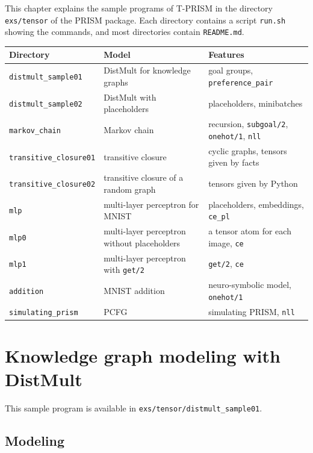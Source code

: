 \documentclass[a4paper]{report}
\begin{document}
This chapter explains the sample programs of T-PRISM in the directory
{\tt exs/tensor} of the PRISM package.  Each directory contains a script
{\tt run.sh} showing the commands, and most directories contain {\tt README.md}.
\begin{center}
	\small
	\begin{tabular}{lP{5.2cm}P{5.0cm}}
		\toprule
		Directory & Model & Features \\
		\midrule
		{\tt distmult\_sample01} & DistMult \cite{Yang15} for knowledge graphs & goal groups, {\tt preference\_pair} \\
		{\tt distmult\_sample02} & DistMult with placeholders & placeholders, minibatches \\
		{\tt markov\_chain} & Markov chain & recursion, {\tt subgoal/2}, {\tt onehot/1}, {\tt nll} \\
		{\tt transitive\_closure01} & transitive closure & cyclic graphs, tensors given by facts \\
		{\tt transitive\_closure02} & transitive closure of a random graph & tensors given by Python \\
		{\tt mlp} & multi-layer perceptron for MNIST \cite{lecun1998mnist} & placeholders, embeddings, {\tt ce\_pl} \\
		{\tt mlp0} & multi-layer perceptron without placeholders & a tensor atom for each image, {\tt ce} \\
		{\tt mlp1} & multi-layer perceptron with {\tt get/2} & {\tt get/2}, {\tt ce} \\
		{\tt addition} & MNIST addition & neuro-symbolic model, {\tt onehot/1} \\
		{\tt simulating\_prism} & PCFG & simulating PRISM, {\tt nll} \\
		\bottomrule
	\end{tabular}
\end{center}

\section{Knowledge graph modeling with DistMult}
\label{sec:distmult01}

This sample program is available in {\tt exs/tensor/distmult\_sample01}.

\subsection*{Modeling}
\end{document}
